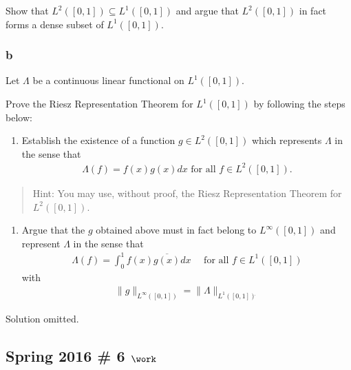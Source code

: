 Show that \(L^2([0, 1]) ⊆ L^1([0, 1])\) and argue that \(L^2([0, 1])\)
in fact forms a dense subset of \(L^1([0, 1])\).

\hypertarget{b-15}{%
\subsubsection{b}\label{b-15}}

Let \(Λ\) be a continuous linear functional on \(L^1([0, 1])\).

Prove the Riesz Representation Theorem for \(L^1([0, 1])\) by following
the steps below:

\begin{enumerate}
\def\labelenumi{\roman{enumi}.}
\tightlist
\item
  Establish the existence of a function \(g ∈ L^2([0, 1])\) which
  represents \(Λ\) in the sense that
  \begin{align*}
    Λ(f ) = f (x)g(x) dx \text{ for all } f ∈ L^2([0, 1]).
    \end{align*}
\end{enumerate}

\begin{quote}
Hint: You may use, without proof, the Riesz Representation Theorem for
\(L^2([0, 1])\).
\end{quote}

\begin{enumerate}
\def\labelenumi{\roman{enumi}.}
\setcounter{enumi}{1}
\tightlist
\item
  Argue that the \(g\) obtained above must in fact belong to
  \(L^∞([0, 1])\) and represent \(Λ\) in the sense that
  \begin{align*}
    \Lambda(f)=\int_{0}^{1} f(x) \overline{g(x)} d x \quad \text { for all } f \in L^{1}([0,1])
    \end{align*}
  with
  \begin{align*}
    \|g\|_{L^{\infty}([0,1])} = \|\Lambda\|_{L^{1}([0,1]) {}^{ \check{} }}
    \end{align*}
\end{enumerate}

Solution omitted.

\hypertarget{spring-2016-6-work}{%
\subsection{\texorpdfstring{Spring 2016 \# 6
\(\work\)}{Spring 2016 \# 6 \textbackslash work}}\label{spring-2016-6-work}}

